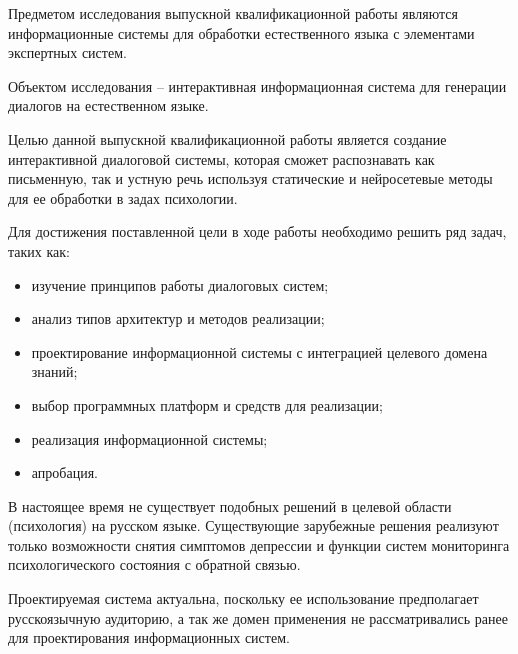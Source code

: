 Предметом исследования выпускной квалификационной работы являются информационные системы для обработки естественного языка с элементами экспертных систем. 

Объектом исследования – интерактивная информационная система для генерации диалогов на естественном языке. 

Целью данной выпускной квалификационной работы является создание интерактивной диалоговой системы, которая сможет распознавать как письменную, так и устную речь используя статические и нейросетевые методы для ее обработки в задах психологии.

Для достижения поставленной цели в ходе работы необходимо решить ряд задач, таких как: 
\begin{itemize}
\item изучение принципов работы диалоговых систем;
\item анализ типов архитектур и методов реализации;
\item проектирование информационной системы с интеграцией целевого домена знаний; 
\item выбор программных платформ и средств для реализации;
\item реализация информационной системы;
\item апробация.
\end{itemize}

В настоящее время не существует подобных решений в целевой области (психология) на русском языке. Существующие зарубежные решения реализуют только возможности снятия симптомов депрессии и функции систем мониторинга психологического состояния с обратной связью. 

Проектируемая система актуальна, поскольку ее использование предполагает русскоязычную аудиторию, а так же домен применения не рассматривались ранее для проектирования информационных систем. 